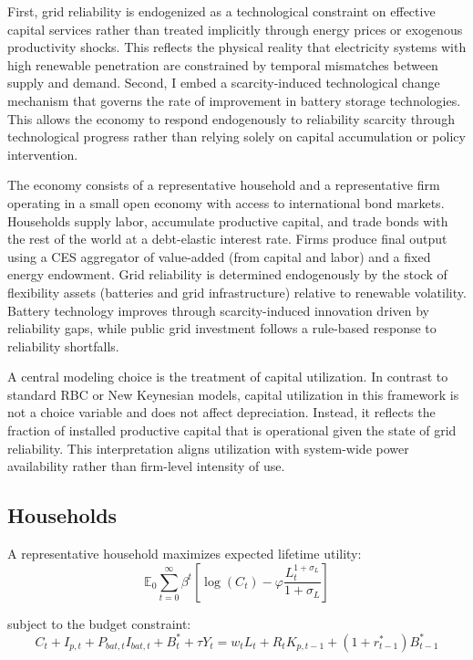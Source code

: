 \documentclass[12pt, a4paper]{article}
\begin{document}
	First, grid reliability is endogenized as a technological constraint on effective capital services rather than treated implicitly through energy prices or exogenous productivity shocks. This reflects the physical reality that electricity systems with high renewable penetration are constrained by temporal mismatches between supply and demand. Second, I embed a scarcity-induced technological change mechanism that governs the rate of improvement in battery storage technologies. This allows the economy to respond endogenously to reliability scarcity through technological progress rather than relying solely on capital accumulation or policy intervention.
	
	The economy consists of a representative household and a representative firm operating in a small open economy with access to international bond markets. Households supply labor, accumulate productive capital, and trade bonds with the rest of the world at a debt-elastic interest rate. Firms produce final output using a CES aggregator of value-added (from capital and labor) and a fixed energy endowment. Grid reliability is determined endogenously by the stock of flexibility assets (batteries and grid infrastructure) relative to renewable volatility. Battery technology improves through scarcity-induced innovation driven by reliability gaps, while public grid investment follows a rule-based response to reliability shortfalls.
	
	A central modeling choice is the treatment of capital utilization. In contrast to standard RBC or New Keynesian models, capital utilization in this framework is not a choice variable and does not affect depreciation. Instead, it reflects the fraction of installed productive capital that is operational given the state of grid reliability. This interpretation aligns utilization with system-wide power availability rather than firm-level intensity of use.
	
	\subsection{Households} \label{sec:households}
	
	A representative household maximizes expected lifetime utility:
	\begin{equation}
		\mathbb{E}_0 \sum_{t=0}^{\infty} \beta^t
		\left[
		\log(C_t) - \varphi \frac{L_t^{1+\sigma_L}}{1+\sigma_L}
		\right]
		\label{eq:utility}
	\end{equation}
	
	subject to the budget constraint:
	\begin{equation}
		C_t + I_{p,t} + P_{bat,t} I_{bat,t} + B^*_t + \tau Y_t
		=
		w_t L_t + R_t K_{p,t-1} + (1+r^*_{t-1}) B^*_{t-1}
		\label{eq:hh_budget}
	\end{equation}
	
\end{document}
